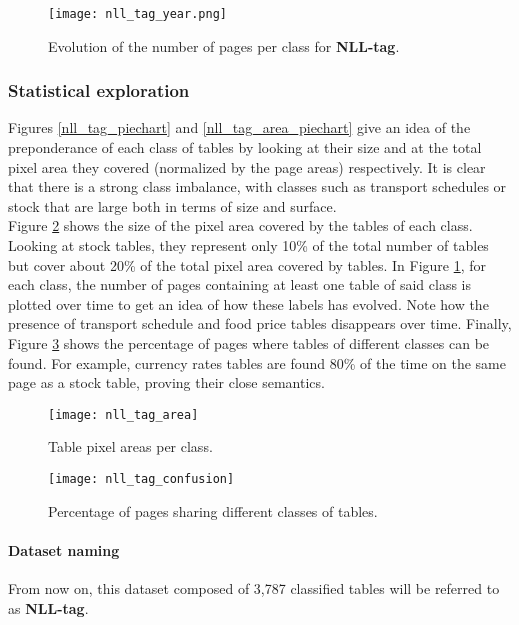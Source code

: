 \begin{figure}[h]
\centering
\texttt{[image: nll\_tag\_year.png]}
\caption{Evolution of the number of pages per class for \textbf{NLL-tag}.}
\label{nll_tag_year}
\end{figure}

\subsubsection{Statistical exploration}
Figures \ref{nll_tag_piechart} and \ref{nll_tag_area_piechart} give an idea of the preponderance of each class of tables by looking at their size and at the total pixel area they covered (normalized by the page areas) respectively. It is clear that there is a strong class imbalance, with classes such as transport schedules or stock that are large both in terms of size and surface. \\
Figure \ref{nll_tag_area} shows the size of the pixel area covered by the tables of each class. Looking at stock tables, they represent only 10\% of the total number of tables but cover about 20\% of the total pixel area covered by tables. In Figure \ref{nll_tag_year}, for each class, the number of pages containing at least one table of said class is plotted over time to get an idea of how these labels has evolved. Note how the presence of transport schedule and food price tables disappears over time. Finally, Figure \ref{nll_tag_confusion} shows the percentage of pages where tables of different classes can be found. For example, currency rates tables are found 80\% of the time on the same page as a stock table, proving their close semantics.

\begin{figure}
\centering
     \texttt{[image: nll\_tag\_area]}
     \caption{Table pixel areas per class.}
     \label{nll_tag_area}
\end{figure}

\begin{figure}
\centering
     \texttt{[image: nll\_tag\_confusion]}
     \caption{Percentage of pages sharing different classes of tables.}
     \label{nll_tag_confusion}
\end{figure}

\paragraph{Dataset naming}
From now on, this dataset composed of 3,787 classified tables will be referred to as \textbf{NLL-tag}.


